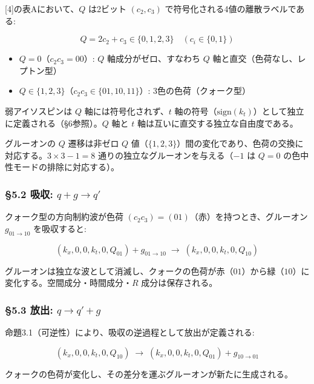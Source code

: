 \documentclass[
  a4paper,11pt]{ltjsarticle}
\providecommand{\tightlist}{%
  \setlength{\itemsep}{0pt}\setlength{\parskip}{0pt}}
\theoremstyle{definition}
\theoremstyle{remark}
\begin{document}
{[}4{]}の表Aにおいて、\(Q\) は2ビット \((c_2, c_3)\)
で符号化される4値の離散ラベルである:

\[Q = 2c_2 + c_3 \in \{0, 1, 2, 3\} \quad (c_i \in \{0, 1\})\]

\begin{itemize}
\tightlist
\item
  \(Q = 0\)（\(c_2 c_3 = 00\)）: \(Q\) 軸成分がゼロ、すなわち \(Q\)
  軸と直交（色荷なし、レプトン型）
\item
  \(Q \in \{1, 2, 3\}\)（\(c_2 c_3 \in \{01, 10, 11\}\)）:
  3色の色荷（クォーク型）
\end{itemize}

弱アイソスピンは \(Q\) 軸には符号化されず、\(t\)
軸の符号（\(\mathrm{sign}(k_t)\)）として独立に定義される（§6参照）。\(Q\)
軸と \(t\) 軸は互いに直交する独立な自由度である。

グルーオンの \(Q\) 遷移は非ゼロ \(Q\)
値（\(\{1, 2, 3\}\)）間の変化であり、色荷の交換に対応する。\(3 \times 3 - 1 = 8\)
通りの独立なグルーオンを与える（\(-1\) は \(Q = 0\)
の色中性モードの排除に対応する）。

\subsubsection{\texorpdfstring{§5.2 吸収:
\(q + g \to q'\)}{§5.2 吸収: q + g \textbackslash to q\textquotesingle{}}}\label{ux5438ux53ce-q-g-to-q}

クォーク型の方向制約波が色荷
\((c_2 c_3) = (01)\)（赤）を持つとき、グルーオン \(g_{01 \to 10}\)
を吸収すると:

\[(k_x, 0, 0, k_t, 0, Q_{01}) + g_{01 \to 10} \;\longrightarrow\; (k_x, 0, 0, k_t, 0, Q_{10})\]

グルーオンは独立な波として消滅し、クォークの色荷が赤（\(01\)）から緑（\(10\)）に変化する。空間成分・時間成分・\(R\)
成分は保存される。

\subsubsection{\texorpdfstring{§5.3 放出:
\(q \to q' + g\)}{§5.3 放出: q \textbackslash to q\textquotesingle{} + g}}\label{ux653eux51fa-q-to-q-g}

命題3.1（可逆性）により、吸収の逆過程として放出が定義される:

\[(k_x, 0, 0, k_t, 0, Q_{10}) \;\longrightarrow\; (k_x, 0, 0, k_t, 0, Q_{01}) + g_{10 \to 01}\]

クォークの色荷が変化し、その差分を運ぶグルーオンが新たに生成される。
\end{document}
